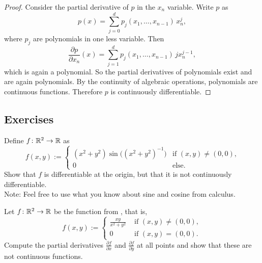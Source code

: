 \begin{proof}
Consider the partial derivative of $p$ in the $x_n$ variable.
Write $p$ as
\begin{equation*}
p(x) = \sum_{j=0}^d p_j(x_1,\ldots,x_{n-1}) \, x_n^j ,
\end{equation*}
where $p_j$ are polynomials in one less variable.
Then
\begin{equation*}
\frac{\partial p}{\partial x_n}(x)
= \sum_{j=1}^d p_j(x_1,\ldots,x_{n-1}) \, j x_n^{j-1} ,
\end{equation*}
which is again a polynomial.
So the partial derivatives of polynomials exist and are again polynomials.
By the continuity of algebraic operations, polynomials are continuous functions.
Therefore $p$ is continuously differentiable.
\end{proof}

\subsection{Exercises}

\begin{exercise}
Define $f \colon {\mathbb{R}}^2 \to {\mathbb{R}}$ as
\begin{equation*}
f(x,y) :=
\begin{cases}
(x^2+y^2)\sin\bigl({(x^2+y^2)}^{-1}\bigr) & \text{if $(x,y)
\not= (0,0)$,} \\
0 & \text{else.}
\end{cases}
\end{equation*}
Show that $f$ is differentiable at the origin, but that it is not 
continuously differentiable.
\\
Note: Feel free to use what you know about sine and cosine from calculus.
\end{exercise}

\begin{exercise}
Let $f \colon {\mathbb{R}}^2 \to {\mathbb{R}}$ be the function from
, that is,
\begin{equation*}
f(x,y)
:=
\begin{cases}
\frac{xy}{x^2+y^2} & \text{ if $(x,y) \not= (0,0)$}, \\
0 & \text{ if $(x,y) = (0,0)$}.
\end{cases}
\end{equation*}
Compute the partial derivatives 
$\frac{\partial f}{\partial x}$ and
$\frac{\partial f}{\partial y}$ at all points and show that these are not
continuous functions.
\end{exercise}


